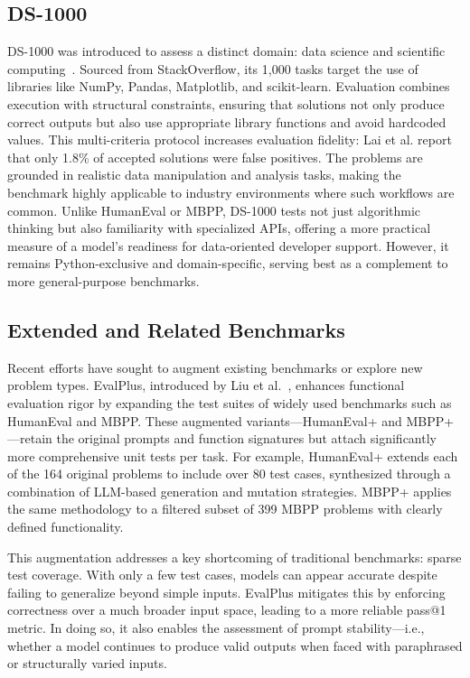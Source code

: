 \subsection{DS-1000}
DS-1000 was introduced to assess a distinct domain: data science and scientific computing~\autocite{lai2022ds1000}. Sourced from StackOverflow, its 1,000 tasks target the use of libraries like NumPy, Pandas, Matplotlib, and scikit-learn. Evaluation combines execution with structural constraints, ensuring that solutions not only produce correct outputs but also use appropriate library functions and avoid hardcoded values. This multi-criteria protocol increases evaluation fidelity: Lai et al. report that only 1.8\% of accepted solutions were false positives. The problems are grounded in realistic data manipulation and analysis tasks, making the benchmark highly applicable to industry environments where such workflows are common. Unlike HumanEval or \gls{MBPP}, DS-1000 tests not just algorithmic thinking but also familiarity with specialized APIs, offering a more practical measure of a model’s readiness for data-oriented developer support. However, it remains Python-exclusive and domain-specific, serving best as a complement to more general-purpose benchmarks.

\subsection{Extended and Related Benchmarks}
Recent efforts have sought to augment existing benchmarks or explore new problem types. EvalPlus, introduced by Liu et al.~\autocite{Liu2023Rigorous}, enhances functional evaluation rigor by expanding the test suites of widely used benchmarks such as HumanEval and \gls{MBPP}. These augmented variants—HumanEval+ and MBPP+—retain the original prompts and function signatures but attach significantly more comprehensive unit tests per task. For example, HumanEval+ extends each of the 164 original problems to include over 80 test cases, synthesized through a combination of LLM-based generation and mutation strategies. MBPP+ applies the same methodology to a filtered subset of 399 MBPP problems with clearly defined functionality.

This augmentation addresses a key shortcoming of traditional benchmarks: sparse test coverage. With only a few test cases, models can appear accurate despite failing to generalize beyond simple inputs. EvalPlus mitigates this by enforcing correctness over a much broader input space, leading to a more reliable pass@1 metric. In doing so, it also enables the assessment of prompt stability—i.e., whether a model continues to produce valid outputs when faced with paraphrased or structurally varied inputs.


